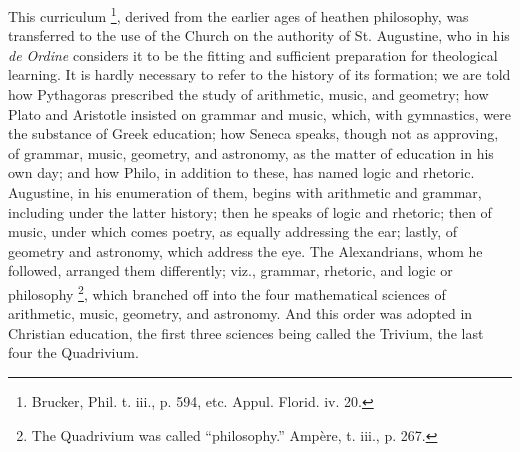 This curriculum \footnote{Brucker,
Phil. t. iii., p. 594, etc. Appul. Florid. iv. 20.},
derived from the earlier ages of heathen philosophy, was transferred
to the use of the Church on the authority of St. Augustine, who in his
\emph{de Ordine} considers it to be the fitting and sufficient
preparation for theological learning. It is hardly necessary to refer
to the history of its formation; we are told how Pythagoras prescribed
the study of arithmetic, music, and geometry; how Plato and Aristotle
insisted on grammar and music, which, with gymnastics, were the
substance of Greek education; how Seneca speaks, though not as
approving, of grammar, music, geometry, and astronomy, as the matter
of education in his own day; and how Philo, in addition to these, has
named logic and rhetoric. Augustine, in his enumeration of them,
begins with arithmetic and grammar, including under the latter
history; then he speaks of logic and rhetoric; then of music, under
which comes poetry, as equally addressing the ear; lastly, of geometry
and astronomy, which address the eye. The Alexandrians, whom he
followed, arranged them differently; viz., grammar, rhetoric, and
logic or philosophy \footnote{The
Quadrivium was called ``philosophy.'' Ampère, t. iii., p.
267.},
which branched off into the four mathematical sciences of arithmetic,
music, geometry, and astronomy. And this order was adopted in
Christian education, the first three sciences being called the
Trivium, the last four the Quadrivium.

